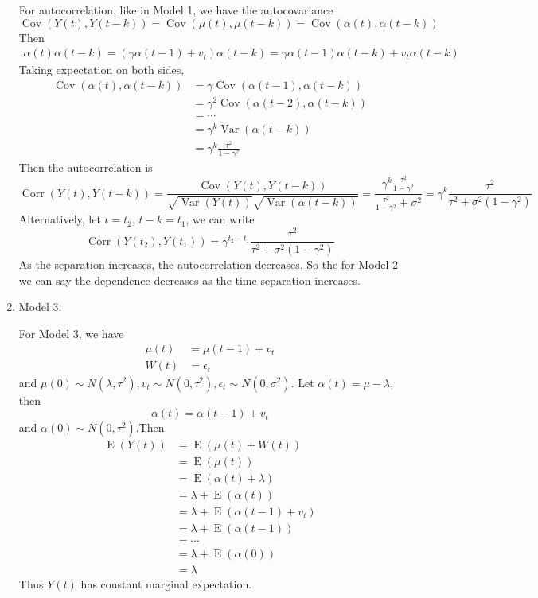 \documentclass{article}
\DeclareMathOperator{\Corr}{Corr}
\DeclareMathOperator{\Cov}{Cov}
\DeclareMathOperator{\Var}{Var}
\DeclareMathOperator{\E}{E}
\begin{document}
\begin{enumerate}
	For autocorrelation, like in Model 1, we have the autocovariance
	\[\Cov(Y(t), Y(t-k)) = \Cov(\mu(t), \mu(t - k)) = \Cov(\alpha(t), \alpha(t - k))\]
	Then
	\begin{align*}
	\alpha(t) \alpha(t - k) = (\gamma \alpha(t-1) + v_t) \alpha(t-k) = \gamma \alpha(t-1) \alpha(t-k) + v_t \alpha(t-k)
	\end{align*}
	Taking expectation on both sides,
	\begin{align*}
	\Cov(\alpha(t), \alpha(t - k)) & = \gamma \Cov(\alpha(t-1), \alpha(t-k))\\
	& = \gamma^2 \Cov(\alpha(t-2), \alpha(t-k))\\
	& = \cdots\\
	& = \gamma^k \Var(\alpha(t - k))\\
	& = \gamma^k \frac{\tau^2}{1 - \gamma^2}
	\end{align*}
	Then the autocorrelation is
	\[\Corr(Y(t), Y(t - k)) = \frac{\Cov(Y(t), Y(t-k))}{\sqrt{\Var(Y(t))}\sqrt{\Var(\alpha(t-k))}} = \frac{\gamma^k \frac{\tau^2}{1 - \gamma^2}}{\frac{\tau^2}{1 - \gamma^2} + \sigma^2} = \gamma^k \frac{\tau^2}{\tau^2 + \sigma^2 (1 - \gamma^2)}\]
	Alternatively, let $t = t_2,\, t - k = t_1$, we can write
	\[\Corr(Y(t_2), Y(t_1)) = \gamma^{t_2 - t_1}\frac{\tau^2}{\tau^2 + \sigma^2 (1 - \gamma^2)}\]
	As the separation increases, the autocorrelation decreases. So the for Model 2 we can say the dependence decreases as the time separation increases.

	 \item Model 3.

	 For Model 3, we have
	 \begin{align*}
	 \mu(t) &= \mu(t-1) + v_t\\
	 W(t) & = \epsilon_t
	 \end{align*}
	 and $\mu(0) \sim N(\lambda, \tau^2), v_t \sim N(0, \tau^2), \epsilon_t \sim N(0, \sigma^2)$. Let $\alpha(t) = \mu - \lambda$, then
	 \[\alpha(t) = \alpha(t-1) + v_t\]
	 and $\alpha(0) \sim N(0, \tau^2)$.Then
	\begin{align*}
	\E(Y(t)) & = \E(\mu(t) + W(t))\\
	& = \E(\mu(t))\\
	& = \E(\alpha(t) + \lambda)\\
	& = \lambda + \E(\alpha(t))\\
	& = \lambda + \E(\alpha(t-1) + v_t)\\
	& = \lambda + \E(\alpha(t-1))\\
	& = \cdots\\
	& = \lambda + \E(\alpha(0))\\
	& = \lambda 
	\end{align*}
	Thus $Y(t)$ has constant marginal expectation.


\end{enumerate}
\end{document}
